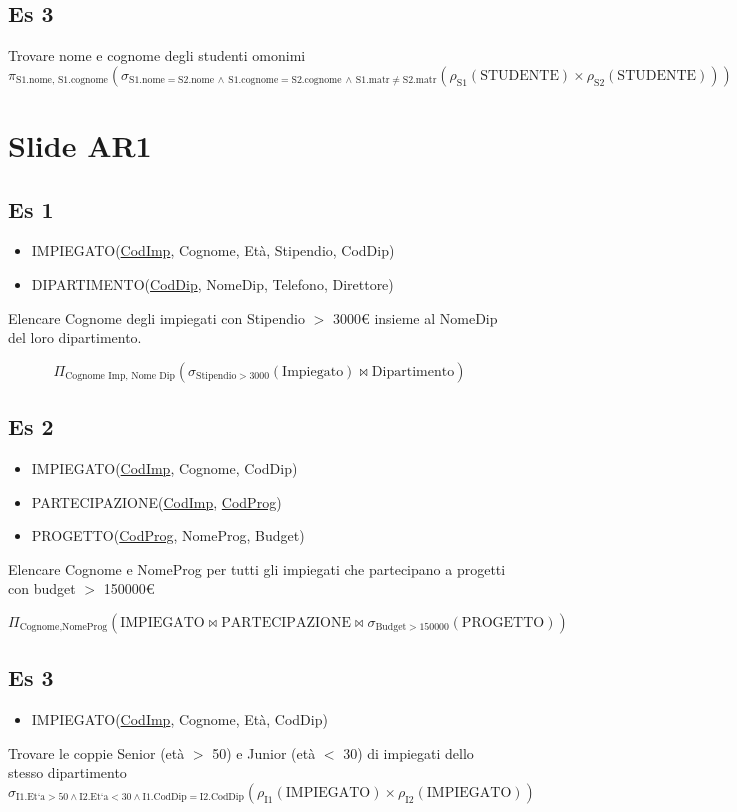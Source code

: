 \subsection{Es 3}
Trovare nome e cognome degli studenti omonimi
$$ \displaystyle \pi_{\text{S1.nome, S1.cognome}} \left( \sigma_{\text{S1.nome} = \text{S2.nome} \, \land \, \text{S1.cognome} = \text{S2.cognome} \, \land \, \text{S1.matr} \neq \text{S2.matr}} \left( \rho_{\text{S1}}(\text{STUDENTE}) \times \rho_{\text{S2}}(\text{STUDENTE}) \right) \right) $$

\newpage
\section{Slide AR1}
\subsection{Es 1}
\begin{itemize}
    \item IMPIEGATO(\underline{CodImp}, Cognome, Et\`a, Stipendio, CodDip)
    \item DIPARTIMENTO(\underline{CodDip}, NomeDip, Telefono, Direttore)
\end{itemize}
Elencare Cognome degli impiegati con Stipendio $>$ 3000€ insieme al NomeDip del loro dipartimento.

\[
\Pi_{\text{Cognome Imp, Nome Dip}} \left( \sigma_{\text{Stipendio} > 3000} (\text{Impiegato}) \bowtie \text{Dipartimento} \right)
\]

\subsection{Es 2}
\begin{itemize}
    \item IMPIEGATO(\underline{CodImp}, Cognome, CodDip)
    \item PARTECIPAZIONE(\underline{CodImp}, \underline{CodProg})
    \item PROGETTO(\underline{CodProg}, NomeProg, Budget)
\end{itemize}
Elencare Cognome e NomeProg per tutti gli impiegati che partecipano a progetti con budget $>$ 150000€

\[
\Pi_{\text{Cognome}, \text{NomeProg}} \left( \text{IMPIEGATO} \bowtie \text{PARTECIPAZIONE} \bowtie \sigma_{\text{Budget} > 150000} (\text{PROGETTO}) \right)
\]

\subsection{Es 3}
\begin{itemize}
    \item IMPIEGATO(\underline{CodImp}, Cognome, Et\`a, CodDip)
\end{itemize}
Trovare le coppie Senior (et\`a $>$ 50) e Junior (et\`a $<$ 30) di impiegati dello stesso dipartimento
$$ \sigma_{\text{I1.Et`a} > 50 \land \text{I2.Et`a} < 30 \land \text{I1.CodDip} = \text{I2.CodDip}} (\rho_{\text{I1}}(\text{IMPIEGATO}) \times \rho_{\text{I2}}(\text{IMPIEGATO})) $$

